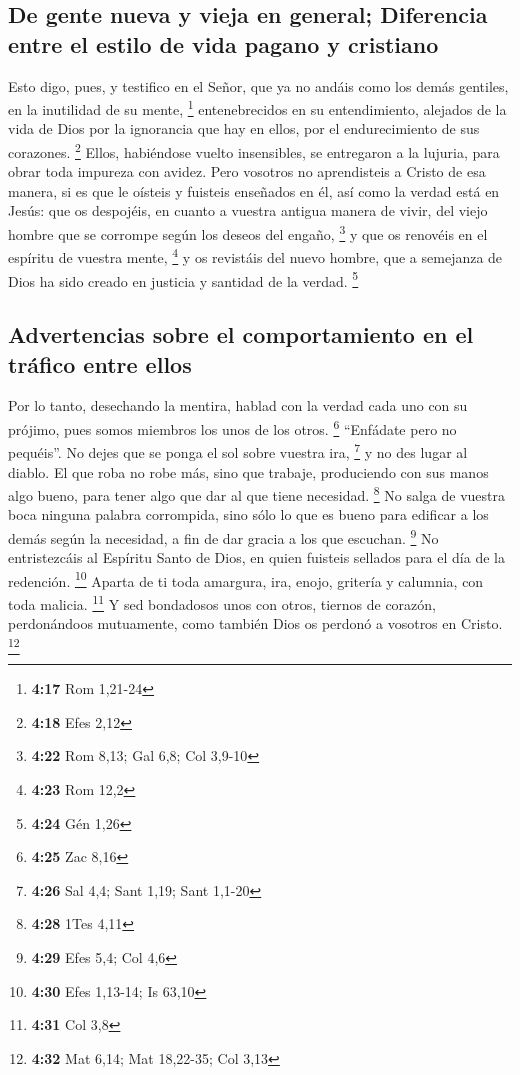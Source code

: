 \hypertarget{de-gente-nueva-y-vieja-en-general-diferencia-entre-el-estilo-de-vida-pagano-y-cristiano}{%
\subsection{De gente nueva y vieja en general; Diferencia entre el
estilo de vida pagano y
cristiano}\label{de-gente-nueva-y-vieja-en-general-diferencia-entre-el-estilo-de-vida-pagano-y-cristiano}}

 Esto digo, pues, y testifico en el Señor, que ya no
andáis como los demás gentiles, en la inutilidad de su mente,
\footnote{\textbf{4:17} Rom 1,21-24}  entenebrecidos en
su entendimiento, alejados de la vida de Dios por la ignorancia que hay
en ellos, por el endurecimiento de sus corazones. \footnote{\textbf{4:18}
  Efes 2,12}  Ellos, habiéndose vuelto insensibles, se
entregaron a la lujuria, para obrar toda impureza con avidez.
 Pero vosotros no aprendisteis a Cristo de esa manera,
 si es que le oísteis y fuisteis enseñados en él, así
como la verdad está en Jesús:  que os despojéis, en
cuanto a vuestra antigua manera de vivir, del viejo hombre que se
corrompe según los deseos del engaño, \footnote{\textbf{4:22} Rom 8,13;
  Gal 6,8; Col 3,9-10}  y que os renovéis en el espíritu
de vuestra mente, \footnote{\textbf{4:23} Rom 12,2}  y os
revistáis del nuevo hombre, que a semejanza de Dios ha sido creado en
justicia y santidad de la verdad. \footnote{\textbf{4:24} Gén 1,26}

\hypertarget{advertencias-sobre-el-comportamiento-en-el-truxe1fico-entre-ellos}{%
\subsection{Advertencias sobre el comportamiento en el tráfico entre
ellos}\label{advertencias-sobre-el-comportamiento-en-el-truxe1fico-entre-ellos}}

 Por lo tanto, desechando la mentira, hablad con la
verdad cada uno con su prójimo, pues somos miembros los unos de los
otros. \footnote{\textbf{4:25} Zac 8,16}  ``Enfádate pero
no pequéis''. No dejes que se ponga el sol sobre vuestra ira,
\footnote{\textbf{4:26} Sal 4,4; Sant 1,19; Sant 1,1-20} 
y no des lugar al diablo.  El que roba no robe más, sino
que trabaje, produciendo con sus manos algo bueno, para tener algo que
dar al que tiene necesidad. \footnote{\textbf{4:28} 1Tes 4,11}
 No salga de vuestra boca ninguna palabra corrompida,
sino sólo lo que es bueno para edificar a los demás según la necesidad,
a fin de dar gracia a los que escuchan. \footnote{\textbf{4:29} Efes
  5,4; Col 4,6}  No entristezcáis al Espíritu Santo de
Dios, en quien fuisteis sellados para el día de la redención.
\footnote{\textbf{4:30} Efes 1,13-14; Is 63,10}  Aparta
de ti toda amargura, ira, enojo, gritería y calumnia, con toda malicia.
\footnote{\textbf{4:31} Col 3,8}  Y sed bondadosos unos
con otros, tiernos de corazón, perdonándoos mutuamente, como también
Dios os perdonó a vosotros en Cristo. \footnote{\textbf{4:32} Mat 6,14;
  Mat 18,22-35; Col 3,13}

